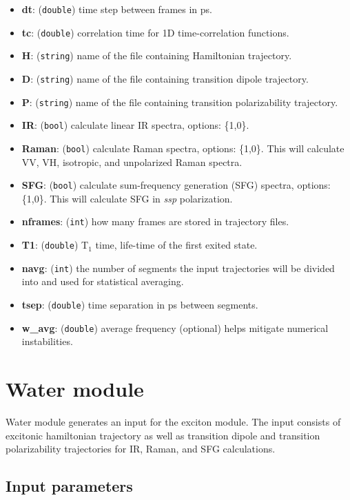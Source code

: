 \documentclass{article}
\begin{document}
\begin{itemize}
\item \textbf{dt}: (\texttt{double}) time step between frames in ps.
\item \textbf{tc}: (\texttt{double}) correlation time for 1D time-correlation functions.
\item \textbf{H}: (\texttt{string}) name of the file containing Hamiltonian trajectory. 
\item \textbf{D}: (\texttt{string}) name of the file containing transition dipole trajectory. 
\item \textbf{P}: (\texttt{string}) name of the file containing transition polarizability trajectory. 
\item \textbf{IR}: (\texttt{bool}) calculate linear IR spectra, options: \{1,0\}.
\item \textbf{Raman}: (\texttt{bool}) calculate Raman spectra, options: \{1,0\}. This will calculate VV, VH, isotropic, and unpolarized Raman spectra.
\item \textbf{SFG}: (\texttt{bool}) calculate sum-frequency generation (SFG) spectra, options: \{1,0\}. This will calculate SFG in \textit{ssp} polarization.
\item \textbf{nframes}: (\texttt{int}) how many frames are stored in trajectory files.
\item \textbf{T1}: (\texttt{double}) T$_1$ time, life-time of the first exited state.
\item \textbf{navg}: (\texttt{int}) the number of segments the input trajectories will be divided into and used for statistical averaging.
\item \textbf{tsep}: (\texttt{double}) time separation in ps between segments.
\item \textbf{w\_avg}: (\texttt{double}) average frequency (optional) helps mitigate numerical instabilities.

\end{itemize}

\section{Water module}
Water module generates an input for the exciton module. The input consists of excitonic hamiltonian trajectory as well as 
transition dipole and transition polarizability trajectories for IR, Raman, and SFG calculations.

\subsection{Input parameters}
\end{document}

